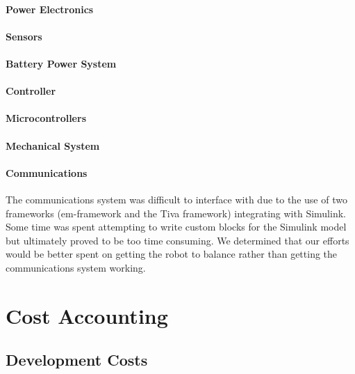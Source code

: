 \documentclass[11pt]{report}
\begin{document}
\begin{spacing}{1.5}
        \paragraph{Power Electronics}
        
        \paragraph{Sensors}
        
        \paragraph{Battery Power System}
        
        \paragraph{Controller}
        
        \paragraph{Microcontrollers}
        
        \paragraph{Mechanical System}
        
        \paragraph{Communications}
        
        The communications system was difficult to interface with due to the use of two frameworks (em-framework and the Tiva framework) integrating with Simulink. Some time was spent attempting to write custom blocks for the Simulink model but ultimately proved to be too time consuming. We determined that our efforts would be better spent on getting the robot to balance rather than getting the communications system working.

\section*{Cost Accounting}

    \subsection*{Development Costs}
    

\end{spacing}
\end{document}
